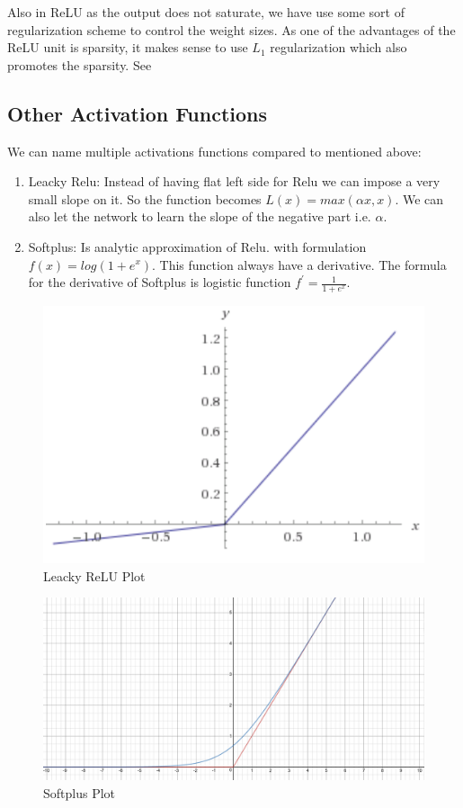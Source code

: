 Also in ReLU as the output does not saturate, we have use some sort of regularization scheme to control the weight sizes. As one of the advantages of the ReLU unit is sparsity, it makes sense to use $L_1$ regularization which also promotes the sparsity. See \cite{pmlr-v15-glorot11a}

\subsection{Other Activation Functions}
We can name multiple activations functions compared to mentioned above: 
\begin{enumerate}
    \item  Leacky Relu: Instead of having flat left side for Relu we can impose a very small slope on it. So the function becomes $L(x) = max(\alpha x , x)$. We can also let the network to learn the slope of the negative part i.e. $\alpha$.  
    \item Softplus: Is analytic approximation of Relu. with formulation $f(x) = log( 1 + e^x)$. This function always have a derivative. The formula for the derivative of Softplus is logistic function $f^{\prime} = \frac{1}{1 + e^x}$. 
\end{enumerate}

\begin{figure}[!htb]
    \centering
    \includegraphics[scale=0.3]{images/leacky_relu.png}
    \caption{Leacky ReLU Plot}
\end{figure}

\begin{figure}[!htb]
    \centering
    \includegraphics[scale=0.3]{images/Softplus.png}
    \caption{Softplus Plot}
\end{figure}

